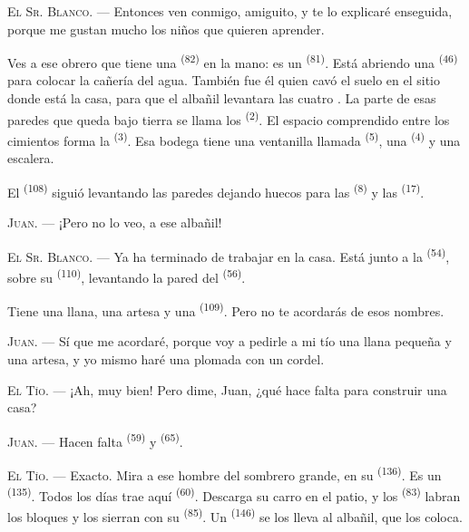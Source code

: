 \VUsaut{3.0mm}

\textsc{El Sr. Blanco}. --- Entonces ven conmigo, amiguito, y te lo
explicaré enseguida, porque me gustan mucho los niños que quieren
aprender.

Ves a ese obrero que tiene una  \textsuperscript{(82)} en la mano: es
un  \textsuperscript{(81)}. Está abriendo una 
\textsuperscript{(46)} para colocar la cañería del agua. También fue él quien
cavó el suelo en el sitio donde está la casa, para que el albañil
levantara las cuatro . La parte de esas paredes que queda
bajo tierra se llama los  \textsuperscript{(2)}. El espacio
comprendido entre los cimientos forma la  \textsuperscript{(3)}. Esa
bodega tiene una ventanilla llamada  \textsuperscript{(5)}, una
 \textsuperscript{(4)} y una escalera.

El  \textsuperscript{(108)} siguió levantando las paredes dejando
huecos para las  \textsuperscript{(8)} y las 
\textsuperscript{(17)}.

\textsc{Juan}. --- ¡Pero no lo veo, a ese albañil!

\textsc{El Sr. Blanco}. --- Ya ha terminado de trabajar en la casa. Está
junto a la  \textsuperscript{(54)}, sobre su 
\textsuperscript{(110)}, levantando la pared del  \textsuperscript{(56)}.

Tiene una llana, una artesa y una  \textsuperscript{(109)}. Pero no
te acordarás de esos nombres.

\textsc{Juan}. --- Sí que me acordaré, porque voy a pedirle a mi tío una
llana pequeña y una artesa, y yo mismo haré una plomada con un cordel.

\VUsaut{3.0mm}
\VUsaut{3.0mm}

\textsc{El Tío}. --- ¡Ah, muy bien! Pero dime, Juan, ¿qué hace falta para
construir una casa?

\textsc{Juan}. --- Hacen falta  \textsuperscript{(59)} y
 \textsuperscript{(65)}.

\textsc{El Tío}. --- Exacto. Mira a ese hombre del sombrero grande, en su
 \textsuperscript{(136)}. Es un  \textsuperscript{(135)}.
Todos los días trae aquí  \textsuperscript{(60)}. Descarga
su carro en el patio, y los  \textsuperscript{(83)} labran los
bloques y los sierran con su  \textsuperscript{(85)}. Un
 \textsuperscript{(146)} se los lleva al albañil, que los coloca.

